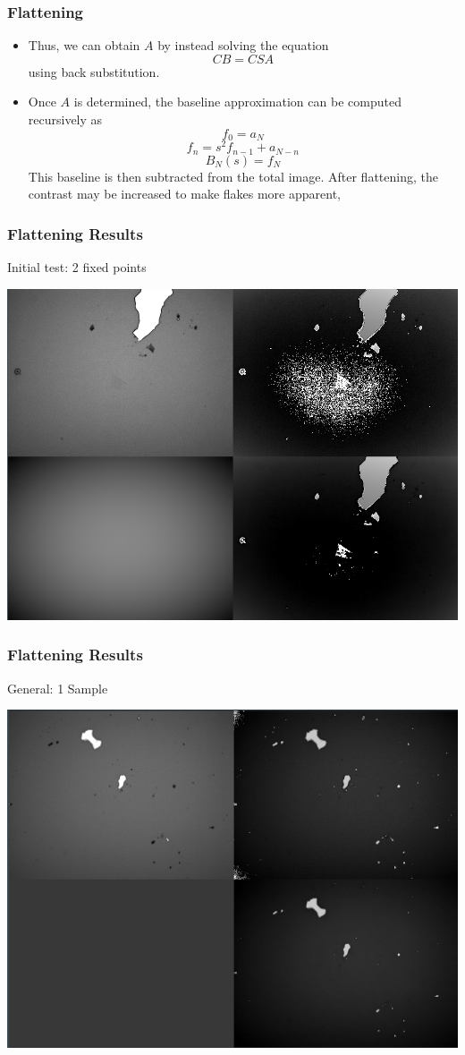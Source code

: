 \documentclass{beamer}
\begin{document}
\begin{frame}
	\frametitle{Flattening}
	\begin{itemize}
		\item<1-> Thus, we can obtain \(A\) by instead solving the equation
			\[CB = CSA\]
			using back substitution.
		\item<2-> Once \(A\) is determined, the baseline approximation can be computed recursively as
			\[f_0 = a_N\]
			\[f_n = s^2 f_{n-1}+a_{N-n}\]
			\[B_N(s) = f_N\]
		This baseline is then subtracted from the total image. After flattening, the contrast may be increased to make flakes more apparent,
	\end{itemize}
\end{frame}

\begin{frame}
	\frametitle{Flattening Results}
	Initial test: 2 fixed points
	\begin{center}
		\includegraphics[scale = 0.3]{image/magic2.png}
	\end{center}
\end{frame}

\begin{frame}
	\frametitle{Flattening Results}
	General: 1 Sample
	\begin{center}
		\includegraphics[scale = 0.25]{image/1samp.png}
	\end{center}
\end{frame}
\end{document}
